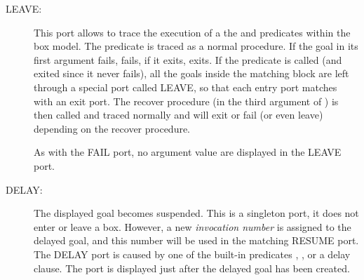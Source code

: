 \begin{description}
\item[LEAVE:]
This port allows to trace the execution of a the
 and
predicates within the box model.  The predicate
 is traced as
a normal procedure.  If the goal in its first argument fails,
 fails, if it
exits,  exits.
If the predicate 
is called (and exited since it
never fails), all the goals inside the matching block are left through
a special port called LEAVE, so that each entry port matches with an
exit port.  The recover procedure (in the third argument of
) is then
called and traced normally and
 will exit or
fail (or even leave) depending on the recover procedure.

As with the FAIL port, no argument value are displayed in the LEAVE port.

%
%

\item[DELAY:]
The displayed goal becomes suspended. This is a singleton port, it does
not enter or leave a box. However, a new \emph{invocation number} is assigned
to the delayed goal, and this number will be used in the matching RESUME port.
The DELAY port is caused by one of the built-in predicates
,
,
or a delay clause.
The port is displayed just after the delayed goal has been created.


\end{description}
